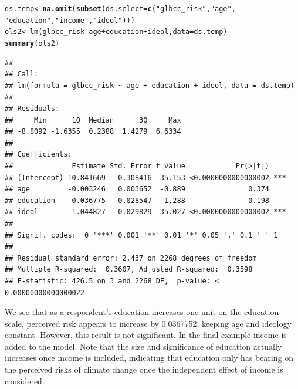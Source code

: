 \documentclass[11pt,openany]{book}\usepackage[]{graphicx}\usepackage[]{color}
\makeatletter
\newcommand{\hlstr}[1]{\textcolor[rgb]{0.192,0.494,0.8}{#1}}%
\newcommand{\hlopt}[1]{\textcolor[rgb]{0,0,0}{#1}}%
\newcommand{\hlstd}[1]{\textcolor[rgb]{0.345,0.345,0.345}{#1}}%
\newcommand{\hlkwb}[1]{\textcolor[rgb]{0.69,0.353,0.396}{#1}}%
\newcommand{\hlkwc}[1]{\textcolor[rgb]{0.333,0.667,0.333}{#1}}%
\newcommand{\hlkwd}[1]{\textcolor[rgb]{0.737,0.353,0.396}{\textbf{#1}}}%
\newenvironment{kframe}{%
 \def\at@end@of@kframe{}%
 \ifinner\ifhmode%
  \def\at@end@of@kframe{\end{minipage}}%
  \begin{minipage}{\columnwidth}%
 \fi\fi%
 \def\FrameCommand##1{\hskip\@totalleftmargin \hskip-\fboxsep
 \colorbox{shadecolor}{##1}\hskip-\fboxsep
     \hskip-\linewidth \hskip-\@totalleftmargin \hskip\columnwidth}%
 \MakeFramed {\advance\hsize-\width
   \@totalleftmargin\z@ \linewidth\hsize
   \@setminipage}}%
 {\par\unskip\endMakeFramed%
 \at@end@of@kframe}
\newenvironment{knitrout}{}{} %
\renewenvironment{knitrout}{\begin{singlespace}}{\end{singlespace}} %
\makeatother
\begin{document}
\begin{knitrout}
\color{fgcolor}\begin{kframe}
\begin{alltt}
\hlstd{ds.temp} \hlkwb{<-} \hlkwd{na.omit}\hlstd{(}\hlkwd{subset}\hlstd{(ds,} \hlkwc{select} \hlstd{=} \hlkwd{c}\hlstd{(}\hlstr{"glbcc_risk"}\hlstd{,} \hlstr{"age"}\hlstd{,}
    \hlstr{"education"}\hlstd{,} \hlstr{"income"}\hlstd{,} \hlstr{"ideol"}\hlstd{)))}
\hlstd{ols2} \hlkwb{<-} \hlkwd{lm}\hlstd{(glbcc_risk} \hlopt{~} \hlstd{age} \hlopt{+} \hlstd{education} \hlopt{+} \hlstd{ideol,} \hlkwc{data} \hlstd{= ds.temp)}
\hlkwd{summary}\hlstd{(ols2)}
\end{alltt}
\begin{verbatim}
## 
## Call:
## lm(formula = glbcc_risk ~ age + education + ideol, data = ds.temp)
## 
## Residuals:
##     Min      1Q  Median      3Q     Max 
## -8.8092 -1.6355  0.2388  1.4279  6.6334 
## 
## Coefficients:
##              Estimate Std. Error t value            Pr(>|t|)    
## (Intercept) 10.841669   0.308416  35.153 <0.0000000000000002 ***
## age         -0.003246   0.003652  -0.889               0.374    
## education    0.036775   0.028547   1.288               0.198    
## ideol       -1.044827   0.029829 -35.027 <0.0000000000000002 ***
## ---
## Signif. codes:  0 '***' 0.001 '**' 0.01 '*' 0.05 '.' 0.1 ' ' 1
## 
## Residual standard error: 2.437 on 2268 degrees of freedom
## Multiple R-squared:  0.3607,	Adjusted R-squared:  0.3598 
## F-statistic: 426.5 on 3 and 2268 DF,  p-value: < 0.00000000000000022
\end{verbatim}
\end{kframe}
\end{knitrout}

We see that as a respondent's education increases one unit on the education scale, perceived risk appears to increase by 0.0367752, keeping age and ideology constant. However, this result is not significant. In the final example income is added to the model. Note that the size and  significance of education actually increases once income is included, indicating that education only has  bearing on the perceived risks of climate change once the independent effect of income is considered.
\end{document}
